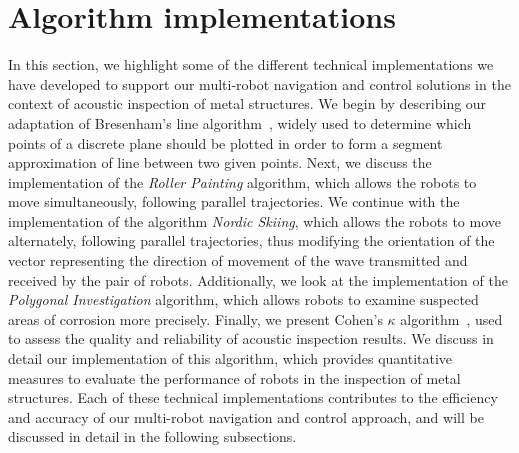 \documentclass[english,RandD]{rapportPFE}  %
\begin{document}
	\section{Algorithm implementations}
		In this section, we highlight some of the different technical implementations we have developed to support our multi-robot navigation and control solutions in the context of acoustic inspection of metal structures.
		We begin by describing our adaptation of Bresenham's line algorithm~\cite{enwiki:1155124335}, widely used to determine which points of a discrete plane should be plotted in order to form a segment approximation of line between two given points.
		Next, we discuss the implementation of the \textit{Roller Painting} algorithm, which allows the robots to move simultaneously, following parallel trajectories.
		We continue with the implementation of the algorithm \textit{Nordic Skiing}, which allows the robots to move alternately, following parallel trajectories, thus modifying the orientation of the vector representing the direction of movement of the wave transmitted and received by the pair of robots.
		Additionally, we look at the implementation of the \textit{Polygonal Investigation} algorithm, which allows robots to examine suspected areas of corrosion more precisely.
		Finally, we present Cohen's $\kappa$ algorithm~\cite{enwiki:1130024730}, used to assess the quality and reliability of acoustic inspection results.
		We discuss in detail our implementation of this algorithm, which provides quantitative measures to evaluate the performance of robots in the inspection of metal structures.
		Each of these technical implementations contributes to the efficiency and accuracy of our multi-robot navigation and control approach, and will be discussed in detail in the following subsections.
\end{document}
